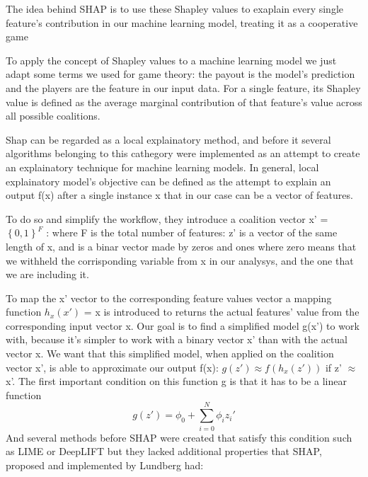 \documentclass[a4paper,11pt]{article}
\begin{document}
The idea behind SHAP is to use these Shapley values to exaplain every single feature's contribution in our machine learning model, treating it as a cooperative game

To apply the concept of Shapley values to a machine learning model we just adapt some terms we used for game theory: the payout is the model's prediction and the players are the feature in our input data.
For a single feature, its Shapley value is defined as the average marginal contribution of that feature's value across all possible coalitions.

Shap can be regarded as a local explainatory method, and before it several algorithms belonging to this cathegory were implemented as an attempt to create an explainatory technique for machine learning models.
In general, local explainatory model's objective can be defined as the attempt to explain an output f(x) after a single instance x that in our case can be a vector of features.

To do so and simplify the workflow, they introduce a coalition vector x' = $\left\{ 0, 1 \right\}^F$ : where F is the total number of features: z' is a vector of the same length of x, and is a binar vector made by zeros and ones where zero means that we withheld the corrisponding variable from x in our analysys, and the one that we are including it.

To map the x' vector to the corresponding feature values vector a mapping function $h_x(x')$ = x is introduced to returns the actual features' value from the corresponding input vector x.
Our goal is to find a simplified model g(x') to work with, because it's simpler to work with a binary vector x' than with the actual vector x.
We want that this simplified model, when applied on the coalition vector x', is able to approximate our output f(x): $ g(z') \approx f(h_x(z'))$ if z' $\approx$ x'.
The first important condition on this function g is that it has to be a linear function
\begin{equation}
g(z') = \phi_0 + \sum_{i = 0}^N \phi_i z_i'
\end{equation}
And several methods before SHAP were created that satisfy this condition such as LIME \cite{} or DeepLIFT \cite{} but they lacked additional properties that SHAP, proposed and implemented by Lundberg \cite{ludberg-} had:
\end{document}

